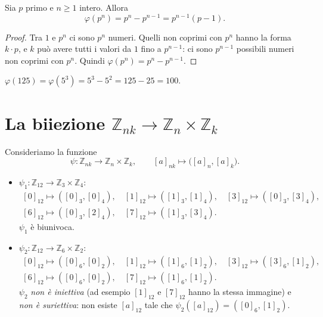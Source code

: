 \documentclass[11pt,a4paper]{article}
\begin{document}
\begin{proposizione}
Sia $p$ primo e $n \ge 1$ intero. Allora
\[
  \varphi(p^n) = p^n - p^{n-1} = p^{n-1}(p - 1) .
\]
\end{proposizione}

\begin{proof}
Tra $1$ e $p^n$ ci sono $p^n$ numeri. Quelli non coprimi con $p^n$ hanno la forma $k\cdot p$, e $k$ può avere tutti i valori da $1$ fino a $p^{n-1}$: ci sono $p^{n-1}$ possibili numeri non coprimi con $p^n$. Quindi $\varphi(p^n) = p^n - p^{n-1}$.
\end{proof}

\begin{esempio}
$\varphi(125) = \varphi(5^3) = 5^3 - 5^2 = 125 - 25 = 100$.
\end{esempio}

\section{La biiezione $\mathbb{Z}_{nk} \to \mathbb{Z}_n \times \mathbb{Z}_k$}

Consideriamo la funzione
\[
  \psi : \mathbb{Z}_{nk} \to \mathbb{Z}_n \times \mathbb{Z}_k, \qquad [a]_{nk} \mapsto \big([a]_n, [a]_k\big).
\]

\begin{esempio}
\begin{itemize}
  \item $\psi_1 : \mathbb{Z}_{12} \to \mathbb{Z}_3 \times \mathbb{Z}_4$:
  \[
    \begin{gathered}
    [0]_{12} \mapsto ([0]_3, [0]_4), \quad [1]_{12} \mapsto ([1]_3, [1]_4), \quad [3]_{12} \mapsto ([0]_3, [3]_4),\\
    [6]_{12} \mapsto ([0]_3, [2]_4), \quad [7]_{12} \mapsto ([1]_3, [3]_4).
    \end{gathered}
  \]
  $\psi_1$ è biunivoca.
  \item $\psi_2 : \mathbb{Z}_{12} \to \mathbb{Z}_6 \times \mathbb{Z}_2$:
  \[
    \begin{gathered}
    [0]_{12} \mapsto ([0]_6, [0]_2), \quad [1]_{12} \mapsto ([1]_6, [1]_2), \quad [3]_{12} \mapsto ([3]_6, [1]_2),\\
    [6]_{12} \mapsto ([0]_6, [0]_2), \quad [7]_{12} \mapsto ([1]_6, [1]_2).
    \end{gathered}
  \]
  $\psi_2$ \emph{non è iniettiva} (ad esempio $[1]_{12}$ e $[7]_{12}$ hanno la stessa immagine) e \emph{non è suriettiva}: non esiste $[a]_{12}$ tale che $\psi_2([a]_{12}) = ([0]_6, [1]_2)$.
\end{itemize}
\end{esempio}
\end{document}
